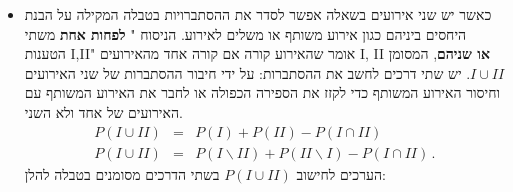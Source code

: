 \documentclass[12pt,a4paper]{article}
\newcommand{\bover}[1]{\bm{\overline{#1}}}
\begin{document}
\begin{itemize}
\item
כאשר יש שני אירועים בשאלה אפשר לסדר את ההסתברויות בטבלה המקילה על הבנת היחסים ביניהם כגון אירוע משותף או משלים לאירוע. הניסוח "%
\textbf{לפחות אחת}
משתי הטענות I,II" אומר שהאירוע קורה אם קורה אחד מהאירועים I, II
\textbf{או שניהם},
המסומן 
$I \cup II$.
יש שתי דרכים לחשב את ההסתברות: על ידי חיבור ההסתברות של שני האירועים וחיסור האירוע המשותף כדי לקזז את הספירה הכפולה או לחבר את האירוע המשותף עם האירועים של אחד ולא השני.
\begin{eqnarray*}
P(I \cup II) &=& P(I) + P(II) - P(I \cap II)\\
P(I \cup II) &=& P(I\backslash II) + P(II\backslash I) - P(I \cap II)\,.
\end{eqnarray*}
הערכים לחישוב
$P(I \cup II)$
בשתי הדרכים מסומנים בטבלה להלן:
\begin{center}
\end{center}



\end{itemize}
\end{document}
